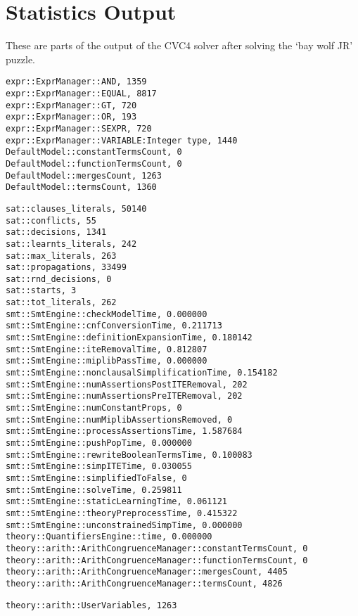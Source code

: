 \chapter{Statistics Output}
These are parts of the output of the CVC4 solver after solving the `bay wolf JR' puzzle.
\lstset{belowskip=-5pt}
\begin{lstlisting}
expr::ExprManager::AND, 1359
expr::ExprManager::EQUAL, 8817
expr::ExprManager::GT, 720
expr::ExprManager::OR, 193
expr::ExprManager::SEXPR, 720
expr::ExprManager::VARIABLE:Integer type, 1440
DefaultModel::constantTermsCount, 0
DefaultModel::functionTermsCount, 0
DefaultModel::mergesCount, 1263
DefaultModel::termsCount, 1360
\end{lstlisting}
 \begin{quote}
   	\center[\ldots]
 \end{quote}
\begin{lstlisting}
sat::clauses_literals, 50140
sat::conflicts, 55
sat::decisions, 1341
sat::learnts_literals, 242
sat::max_literals, 263
sat::propagations, 33499
sat::rnd_decisions, 0
sat::starts, 3
sat::tot_literals, 262
smt::SmtEngine::checkModelTime, 0.000000
smt::SmtEngine::cnfConversionTime, 0.211713
smt::SmtEngine::definitionExpansionTime, 0.180142
smt::SmtEngine::iteRemovalTime, 0.812807
smt::SmtEngine::miplibPassTime, 0.000000
smt::SmtEngine::nonclausalSimplificationTime, 0.154182
smt::SmtEngine::numAssertionsPostITERemoval, 202
smt::SmtEngine::numAssertionsPreITERemoval, 202
smt::SmtEngine::numConstantProps, 0
smt::SmtEngine::numMiplibAssertionsRemoved, 0
smt::SmtEngine::processAssertionsTime, 1.587684
smt::SmtEngine::pushPopTime, 0.000000
smt::SmtEngine::rewriteBooleanTermsTime, 0.100083
smt::SmtEngine::simpITETime, 0.030055
smt::SmtEngine::simplifiedToFalse, 0
smt::SmtEngine::solveTime, 0.259811
smt::SmtEngine::staticLearningTime, 0.061121
smt::SmtEngine::theoryPreprocessTime, 0.415322
smt::SmtEngine::unconstrainedSimpTime, 0.000000
theory::QuantifiersEngine::time, 0.000000
theory::arith::ArithCongruenceManager::constantTermsCount, 0
theory::arith::ArithCongruenceManager::functionTermsCount, 0
theory::arith::ArithCongruenceManager::mergesCount, 4405
theory::arith::ArithCongruenceManager::termsCount, 4826
\end{lstlisting}
 \begin{quote}
   	\center[\ldots]
 \end{quote}
\begin{lstlisting}
theory::arith::UserVariables, 1263
\end{lstlisting}
 \begin{quote}
   	\center[\ldots]
 \end{quote}
